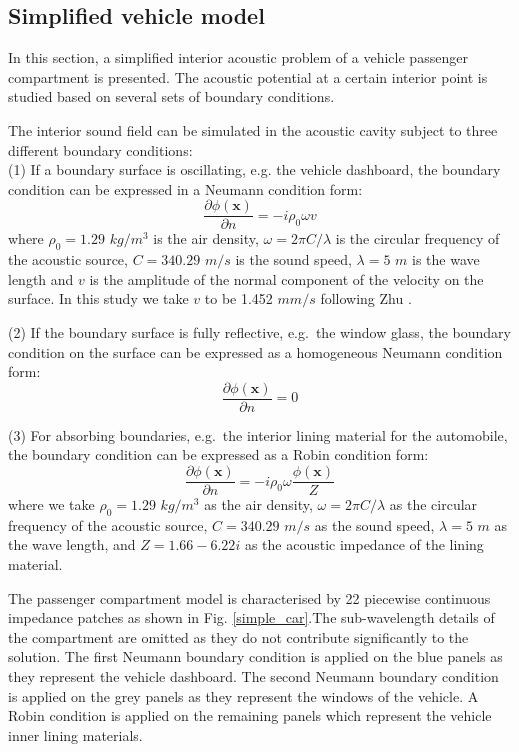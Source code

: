 \documentclass[review]{elsarticle}
\begin{document}
\subsection{Simplified vehicle model}

In this section, a simplified interior acoustic problem of a vehicle passenger compartment is presented. The acoustic potential at a certain interior point is studied based on several sets of boundary conditions.

The interior sound field can be simulated in the acoustic cavity subject to three different boundary conditions:\\

(1) If a boundary surface is oscillating, e.g. the vehicle dashboard, the boundary condition can be expressed in a Neumann condition form:\\
\begin{equation}
\frac{\partial\phi(\mathbf{x})}{\partial{n}}=-i\rho_0\omega v
\end{equation}
where $\rho_0=1.29$ $kg/m^3$ is the air density, $\omega=2\pi C/\lambda$ is the circular frequency of the acoustic source, $C = 340.29$ $m/s$ is the sound speed, $\lambda=5$ $m$ is the wave length and $v$ is the amplitude of the normal component of the velocity on the surface. In this study we take $v$ to be 1.452 $mm/s$ following Zhu \cite{Jing}.

(2) If the boundary surface is fully reflective, e.g.~the window glass, the boundary condition on the surface can be expressed as a homogeneous Neumann condition form:\\
\begin{equation}
\frac{\partial\phi(\mathbf{x})}{\partial{n}}=0
\end{equation}

(3) For absorbing boundaries, e.g.~the interior lining material for the automobile, the boundary condition can be expressed as a Robin condition form:\\
 \begin{equation}
 \frac{\partial\phi(\mathbf{x})}{\partial{n}}= -i\rho_0\omega\frac{\phi(\mathbf{x})}{Z}
 \end{equation}
where we take $\rho_0=1.29$ $kg/m^3$ as the air density, $\omega=2\pi C/\lambda$ as the circular frequency of the acoustic source, $C = 340.29$ $m/s$ as the sound speed, $\lambda=5$ $m$ as the wave length, and $Z =1.66-6.22i$ \cite{Jing} as the acoustic impedance of the lining material.

The passenger compartment model is characterised by 22 piecewise continuous impedance patches as shown in Fig. \ref{simple_car}.The sub-wavelength details of the compartment are omitted as they do not contribute significantly to the solution. The first Neumann boundary condition is applied on the blue panels as they represent the vehicle dashboard. The second Neumann boundary condition is applied on the grey panels as they represent the windows of the vehicle. A Robin condition is applied on the remaining panels which represent the vehicle inner lining materials.
\end{document}
